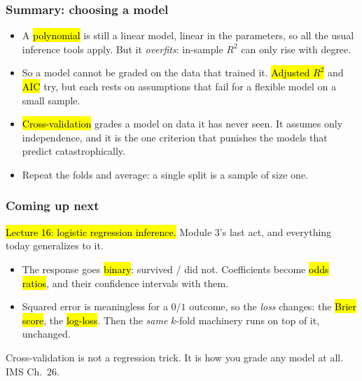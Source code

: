 \documentclass[slidestop,compress,mathserif]{beamer}
\begin{document}
\begin{frame}
\frametitle{Summary: choosing a model}

\begin{itemize}
\item A \hl{polynomial} is still a linear model, linear in the parameters, so all the usual inference tools apply. But it \emph{overfits}: in-sample $R^2$ can only rise with degree.
\item So a model cannot be graded on the data that trained it. \hl{Adjusted $R^2$} and \hl{AIC} try, but each rests on assumptions that fail for a flexible model on a small sample.
\item \hl{Cross-validation} grades a model on data it has never seen. It assumes only independence, and it is the one criterion that punishes the models that predict catastrophically.
\item Repeat the folds and average: a single split is a sample of size one.
\end{itemize}

\end{frame}


\begin{frame}
\frametitle{Coming up next}

\hl{Lecture 16: logistic regression inference.} Module 3's last act, and everything today generalizes to it.

\vspace{0.4em}
\begin{itemize}
\item The response goes \hl{binary}: survived / did not. Coefficients become \hl{odds ratios}, and their confidence intervals with them.
\item Squared error is meaningless for a $0/1$ outcome, so the \emph{loss} changes: the \hl{Brier score}, the \hl{log-loss}. Then the \emph{same} $k$-fold machinery runs on top of it, unchanged.
\end{itemize}

\vspace{0.4em}
{\small Cross-validation is not a regression trick. It is how you grade any model at all. IMS Ch.\ 26.}

\end{frame}
\end{document}
